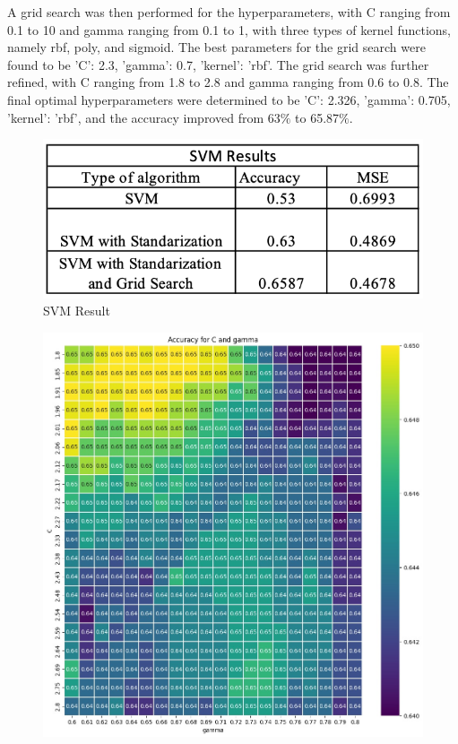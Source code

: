 \documentclass[conference]{IEEEtran}
\begin{document}
{A grid search was then performed for the hyperparameters, with C ranging from 0.1 to 10 and gamma ranging from 0.1 to 1, with three types of kernel functions, namely rbf, poly, and sigmoid. The best parameters for the grid search were found to be {'C': 2.3, 'gamma': 0.7, 'kernel': 'rbf'}. The grid search was further refined, with C ranging from 1.8 to 2.8 and gamma ranging from 0.6 to 0.8. The final optimal hyperparameters were determined to be {'C': 2.326, 'gamma': 0.705, 'kernel': 'rbf'}, and the accuracy improved from 63$\%$ to 65.87$\%$.\\
	\begin{figure}[h]
	\label{fig:foo}
	\begin{center}
	\includegraphics[scale=0.5]{SVMResult.png}
	\caption{SVM Result}
	\end{center}
	\end{figure}
	\begin{figure}[h]
	\label{fig:foo}
	\begin{center}
	\includegraphics[scale=0.28]{SVMHeatMap.jpeg}

\end{center}
\end{figure}}
\end{document}

